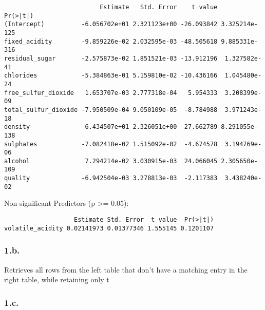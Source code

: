 \documentclass[
  12pt,
  letterpaper,
  DIV=11,
  numbers=noendperiod]{scrartcl}
\newenvironment{Shaded}{\begin{snugshade}}{\end{snugshade}}
\newcommand{\AttributeTok}[1]{\textcolor[rgb]{0.40,0.45,0.13}{#1}}
\newcommand{\CommentTok}[1]{\textcolor[rgb]{0.37,0.37,0.37}{#1}}
\newcommand{\FloatTok}[1]{\textcolor[rgb]{0.68,0.00,0.00}{#1}}
\newcommand{\FunctionTok}[1]{\textcolor[rgb]{0.28,0.35,0.67}{#1}}
\newcommand{\NormalTok}[1]{\textcolor[rgb]{0.00,0.23,0.31}{#1}}
\newcommand{\OtherTok}[1]{\textcolor[rgb]{0.00,0.23,0.31}{#1}}
\newcommand{\SpecialCharTok}[1]{\textcolor[rgb]{0.37,0.37,0.37}{#1}}
\newcommand{\StringTok}[1]{\textcolor[rgb]{0.13,0.47,0.30}{#1}}
\begin{document}
\begin{verbatim}
                          Estimate   Std. Error    t value      Pr(>|t|)
(Intercept)          -6.056702e+01 2.321123e+00 -26.093842 3.325214e-125
fixed_acidity        -9.859226e-02 2.032595e-03 -48.505618 9.885331e-316
residual_sugar       -2.575873e-02 1.851521e-03 -13.912196  1.327582e-41
chlorides            -5.384863e-01 5.159810e-02 -10.436166  1.045480e-24
free_sulfur_dioxide   1.653707e-03 2.777318e-04   5.954333  3.208399e-09
total_sulfur_dioxide -7.950509e-04 9.050109e-05  -8.784988  3.971243e-18
density               6.434507e+01 2.326051e+00  27.662789 8.291055e-138
sulphates            -7.082418e-02 1.515092e-02  -4.674578  3.194769e-06
alcohol               7.294214e-02 3.030915e-03  24.066045 2.305650e-109
quality              -6.942504e-03 3.278813e-03  -2.117383  3.438240e-02
\end{verbatim}

Non-significant Predictors (p \textgreater= 0.05):

\begin{Shaded}
\end{Shaded}

\begin{verbatim}
                   Estimate Std. Error  t value  Pr(>|t|)
volatile_acidity 0.02141973 0.01377346 1.555145 0.1201107
\end{verbatim}

\subsubsection{\texorpdfstring{\textbf{1.b.}}{1.b.}}\label{b.}

Retrieves all rows from the left table that don't have a matching entry
in the right table, while retaining only t

\subsubsection{\texorpdfstring{\textbf{1.c.}}{1.c.}}\label{c.}
\end{document}
